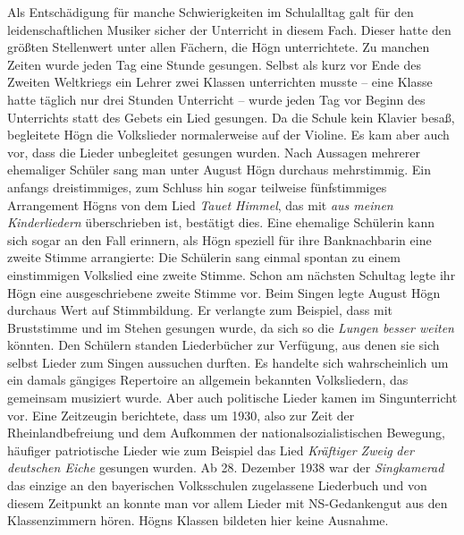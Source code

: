 \documentclass{book}
\newcommand{\zitat}[1]{\textit{#1}}
\begin{document}
Als Entschädigung für manche Schwierigkeiten im Schulalltag galt für den
leidenschaftlichen Musiker sicher der Unterricht in diesem Fach. Dieser
hatte den größten Stellenwert unter allen Fächern, die Högn
unterrichtete. Zu man\-chen Zeiten wurde jeden Tag eine Stunde
gesungen. Selbst als kurz vor Ende des Zweiten Weltkriegs ein Lehrer
zwei Klassen unterrichten musste – eine Klasse hatte täglich nur drei
Stunden Unterricht – wurde jeden Tag vor Be\-ginn des Unterrichts statt
des Gebets ein Lied gesungen. Da die Schule kein Klavier besaß,
begleitete Högn die Volkslieder normalerweise auf der Violine. Es kam
aber auch vor, dass die Lieder unbegleitet gesungen wurden. Nach
Aussagen mehrerer ehemaliger Schüler sang man unter August Högn
durch\-aus mehrstimmig. Ein anfangs dreistimmiges, zum Schluss hin
sogar teilweise fünfstimmiges Arrangement Högns von dem Lied
\textit{Tauet Himmel}, das mit \textit{aus meinen Kinderliedern}
überschrieben ist, bestätigt dies. Eine ehemalige Schülerin kann sich
sogar an den Fall erinnern, als Högn speziell für ihre Banknachbarin
eine zweite Stimme arrangierte: Die Schülerin sang einmal spontan zu
einem einstimmigen Volkslied eine zweite Stimme. Schon am nächsten
Schultag legte ihr Högn eine ausgeschriebene zweite Stimme vor. Beim
Singen legte August Högn durchaus Wert auf Stimmbildung. Er verlangte
zum Beispiel, dass mit Bruststimme und im Stehen gesungen wurde, da
sich so die \zitat{Lungen besser weiten} könnten. Den
Schülern standen Liederbücher zur Verfügung, aus denen sie sich selbst
Lieder zum Singen aussuchen durften. Es handelte sich wahr\-scheinlich
um ein damals gängiges Repertoire an allgemein bekannten
Volks\-liedern, das gemeinsam musiziert wurde. Aber auch politische
Lieder kamen im Singunterricht vor. Eine Zeitzeugin berichtete, dass um
1930, also zur Zeit der Rheinlandbefreiung und dem Aufkommen der
nationalsozialistischen Bewegung, häufiger patriotische Lieder wie zum
Beispiel das Lied \textit{Kräftiger Zweig} \textit{der deutschen Eiche}
gesungen wurden. Ab 28. Dezember 1938 war der \textit{Sing\-kamerad}
das einzige an den bayerischen Volksschulen zugelassene Liederbuch und
von diesem Zeitpunkt an konnte man vor allem Lieder mit
NS-Gedan\-kengut aus den Klassenzimmern hören. Högns Klassen bildeten
hier keine Ausnahme.

\end{document}
